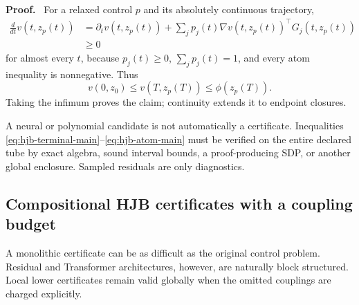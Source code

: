 \documentclass[twoside,11pt]{article}
\renewenvironment{proof}[1][Proof]{\par\noindent\textbf{#1.}\ }{\hfill\BlackBox\par\medskip}
\begin{document}
\begin{proof}
For a relaxed control $p$ and its absolutely continuous trajectory,
\begin{align}
 \frac{d}{dt}v(t,z_p(t))
 &=\partial_tv(t,z_p(t))
   +\sum_jp_j(t)\nabla v(t,z_p(t))^\top G_j(t,z_p(t))\\
 &\ge0
 \label{eq:hjb-chain-main}
\end{align}
for almost every $t$, because $p_j(t)\ge0$, $\sum_jp_j(t)=1$, and every atom inequality is nonnegative.  Thus
\begin{equation}
 v(0,z_0)\le v(T,z_p(T))\le\phi(z_p(T)).
 \label{eq:hjb-path-main}
\end{equation}
Taking the infimum proves the claim; continuity extends it to endpoint closures.
\end{proof}

A neural or polynomial candidate is not automatically a certificate.  Inequalities \eqref{eq:hjb-terminal-main}--\eqref{eq:hjb-atom-main} must be verified on the entire declared tube by exact algebra, sound interval bounds, a proof-producing SDP, or another global enclosure.  Sampled residuals are only diagnostics.

\subsection{Compositional HJB certificates with a coupling budget}
\label{sec:compositional-hjb-main}

A monolithic certificate can be as difficult as the original control problem.
Residual and Transformer architectures, however, are naturally block
structured.  Local lower certificates remain valid globally when the omitted
couplings are charged explicitly.
\end{document}
